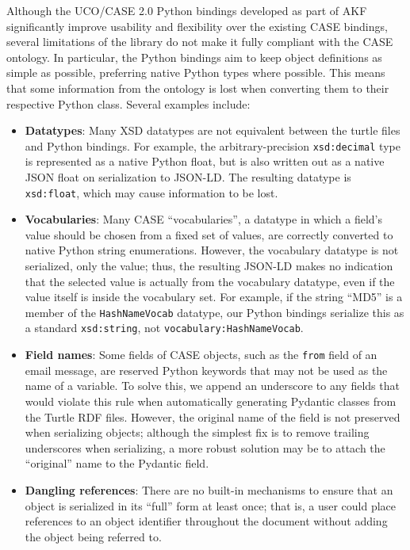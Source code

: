 \documentclass[letterpaper,12pt]{report}
\def\tightlist{}
\newcommand{\passthrough}[1]{#1}
\begin{document}
Although the UCO/CASE 2.0 Python bindings developed as part of AKF
significantly improve usability and flexibility over the existing CASE
bindings, several limitations of the library do not make it fully
compliant with the CASE ontology. In particular, the Python bindings aim
to keep object definitions as simple as possible, preferring native
Python types where possible. This means that some information from the
ontology is lost when converting them to their respective Python class.
Several examples include:

\begin{itemize}
\tightlist
\item
  \textbf{Datatypes}: Many XSD datatypes are not equivalent between the
  turtle files and Python bindings. For example, the arbitrary-precision
  \passthrough{\lstinline!xsd:decimal!} type is represented as a native
  Python float, but is also written out as a native JSON float on
  serialization to JSON-LD. The resulting datatype is
  \passthrough{\lstinline!xsd:float!}, which may cause information to be
  lost.
\item
  \textbf{Vocabularies}: Many CASE ``vocabularies'', a datatype in which
  a field's value should be chosen from a fixed set of values, are
  correctly converted to native Python string enumerations. However, the
  vocabulary datatype is not serialized, only the value; thus, the
  resulting JSON-LD makes no indication that the selected value is
  actually from the vocabulary datatype, even if the value itself is
  inside the vocabulary set. For example, if the string ``MD5'' is a
  member of the \passthrough{\lstinline!HashNameVocab!} datatype, our
  Python bindings serialize this as a standard
  \passthrough{\lstinline!xsd:string!}, not
  \passthrough{\lstinline!vocabulary:HashNameVocab!}.
\item
  \textbf{Field names}: Some fields of CASE objects, such as the
  \passthrough{\lstinline!from!} field of an email message, are reserved
  Python keywords that may not be used as the name of a variable. To
  solve this, we append an underscore to any fields that would violate
  this rule when automatically generating Pydantic classes from the
  Turtle RDF files. However, the original name of the field is not
  preserved when serializing objects; although the simplest fix is to
  remove trailing underscores when serializing, a more robust solution
  may be to attach the ``original'' name to the Pydantic field.
\item
  \textbf{Dangling references}: There are no built-in mechanisms to
  ensure that an object is serialized in its ``full'' form at least
  once; that is, a user could place references to an object identifier
  throughout the document without adding the object being referred to.
\end{itemize}
\end{document}
